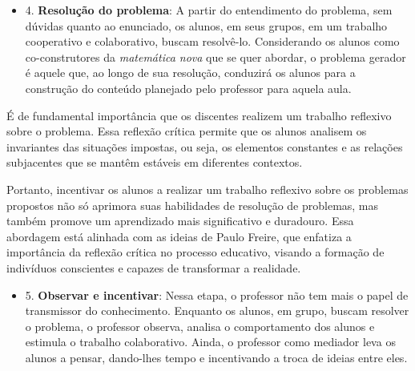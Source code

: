 
\begin{itemize}
    \item 4. \textbf{Resolução do problema}: A partir do entendimento do problema, sem dúvidas quanto ao enunciado, os alunos, em seus grupos, em um trabalho cooperativo e colaborativo, buscam resolvê-lo. Considerando os alunos como co-construtores da \textit{matemática nova} que se quer abordar, o problema gerador é aquele que, ao longo de sua resolução, conduzirá os alunos para a construção do conteúdo planejado pelo professor para aquela aula. \cite{BOLEMAAllevatoOnuchic2011}
\end{itemize}

É de fundamental importância que os discentes realizem um trabalho reflexivo sobre o problema. Essa reflexão crítica permite que os alunos analisem os invariantes das situações impostas, ou seja, os elementos constantes e as relações subjacentes que se mantêm estáveis em diferentes contextos.

Portanto, incentivar os alunos a realizar um trabalho reflexivo sobre os problemas propostos não só aprimora suas habilidades de resolução de problemas, mas também promove um aprendizado mais significativo e duradouro. Essa abordagem está alinhada com as ideias de Paulo Freire, que enfatiza a importância da reflexão crítica no processo educativo, visando a formação de indivíduos conscientes e capazes de transformar a realidade.


\begin{itemize}
    \item 5. \textbf{Observar e incentivar}: Nessa etapa, o professor não tem mais o papel de transmissor do conhecimento. Enquanto os alunos, em grupo, buscam resolver o problema, o professor observa, analisa o comportamento dos alunos e estimula o trabalho colaborativo. Ainda, o professor como mediador leva os alunos a pensar, dando-lhes tempo e incentivando a troca de ideias entre eles. \cite{BOLEMAAllevatoOnuchic2011}
\end{itemize}

